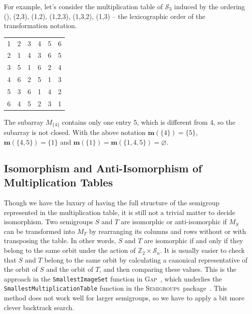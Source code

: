 \documentclass{amsart}
\newcommand{\cS}{{\mathcal S}}
\newcommand{\Miss}{\mathbf{m}}
\newcommand{\Z}{\mathbb{Z}}
\newcommand{\todo}[1]{\textcolor{red}{ \small \textsf{[ #1 ]} \normalsize}}
\theoremstyle{plain}
\theoremstyle{definition}
\newcommand{\GAP}{\textsc{Gap}}
\newcommand{\Semigroups}{\textsc{Semigroups}}
\begin{document}
For example, let's consider the multiplication table of $\cS_3$ induced by the ordering (), (2,3), (1,2), (1,2,3), (1,3,2), (1,3) -- the lexicographic order of the transformation notation.
\begin{center}
\begin{tabular}{@{}c@{}c@{}c@{}c@{}c@{}c@{}}
1&\color{lgr}2&\color{lgr}3&4&5&\color{lgr}6\\
\color{lgr}2&\color{lgr}1&\color{lgr}4&\color{lgr}3&\color{lgr}6&\color{lgr}5\\
\color{lgr}3&\color{lgr}5&\color{lgr}1&\color{lgr}6&\color{lgr}2&\color{lgr}4\\
4&\color{lgr}6&\color{lgr}2&5&1&\color{lgr}3\\
5&\color{lgr}3&\color{lgr}6&1&4&\color{lgr}2\\
\color{lgr}6&\color{lgr}4&\color{lgr}5&\color{lgr}2&\color{lgr}3&\color{lgr}1\\
\end{tabular}
\end{center}
The subarray $M_{\{4\}}$ contains only one entry 5, which is different from 4, so the subarray is not closed. With the above notation $\Miss(\{4\})=\{5\}$, $\Miss(\{4,5\})=\{1\}$ and $\Miss(\{1\})=\Miss(\{1,4,5\})=\varnothing$. 
\subsection{Isomorphism and Anti-Isomorphism of Multiplication Tables}

Though we have the luxury of having the full structure of the semigroup represented in the multiplication table, it is still not a trivial matter to decide isomorphism.
Two semigroups $S$ and $T$ are isomorphic or anti-isomorphic if $M_S$ can be transformed into $M_T$ by rearranging its columns and rows without or with transposing the table.
In other words, $S$ and $T$ are isomorphic if and only if they belong to the same orbit under the action of $\Z_2\times \cS_n$.
It is usually easier to check that $S$ and $T$ belong to the same orbit by calculating a canonical representative of the orbit of $S$ and the orbit of $T$, and then comparing these values.
This is the approach in the \texttt{SmallestImageSet} function in \GAP~\cite{GAP4}, which underlies the \texttt{SmallestMultiplicationTable} function in the \Semigroups~package~\cite{Semigroups}.
This method does not work well for larger semigroups, so we have to apply a bit more clever backtrack search.
\end{document}
